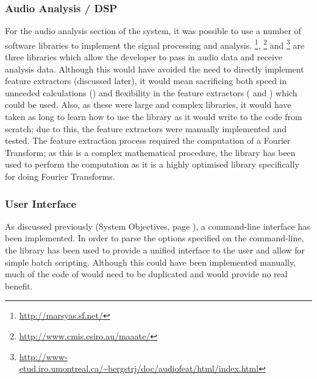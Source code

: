 {\subsubsection{Audio Analysis / DSP}
For the audio analysis section of the system, it was possible to use a number of software libraries to implement the signal processing and analysis. \footnote{\url{http://marsyas.sf.net/}}, \footnote{\url{http://www.cmis.csiro.au/maaate/}} and \footnote{\url{http://www-etud.iro.umontreal.ca/~bergstrj/doc/audiofeat/html/index.html}}  are three libraries which allow the developer to pass in audio data and receive analysis data. Although this would have avoided the need to directly implement feature extractors (discussed later), it would mean sacrificing both speed in unneeded calculations () and flexibility in the feature extractors ( and ) which could be used. Also, as these were large and complex libraries, it would have taken as long to learn how to use the library as it would write to the code from scratch; due to this, the feature extractors were manually implemented and tested.
The feature extraction process required the computation of a Fourier Transform; as this is a complex mathematical procedure, the   library has been used to perform the computation as it is a highly optimised library specifically for doing Fourier Transforms.
\subsubsection{User Interface}
As discussed previously (System Objectives, page \pageref{text:spec:objective:cli}), a command-line interface has been implemented. In order to parse the options specified on the command-line, the  library has been used to provide a unified interface to the user and allow for simple batch scripting. Although this could have been implemented manually, much of the code of  would need to be duplicated and would provide no real benefit.
\begin{comment}

\end{comment}}
